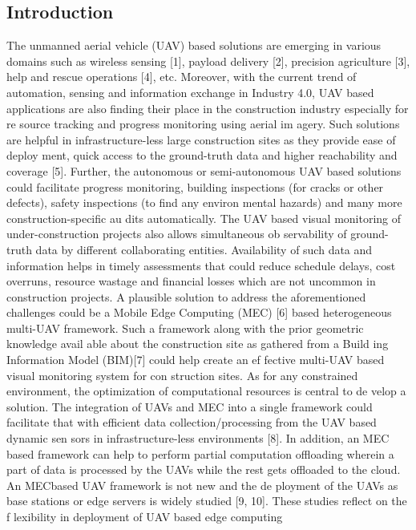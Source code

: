 \documentclass[a0,portrait ] {article}
\begin{document}
\begin{multicols}{2}
\section{Introduction} \label{sec:2}
The unmanned aerial vehicle (UAV) based solutions are
 emerging in various domains such as wireless sensing [1],
 payload delivery [2], precision agriculture [3], help and
 rescue operations [4], etc. Moreover, with the current
 trend of automation, sensing and information exchange
 in Industry 4.0, UAV based applications are also finding
 their place in the construction industry especially for re
source tracking and progress monitoring using aerial im
agery. Such solutions are helpful in infrastructure-less
 large construction sites as they provide ease of deploy
ment, quick access to the ground-truth data and higher
 reachability and coverage [5]. Further, the autonomous
 or semi-autonomous UAV based solutions could facilitate
 progress monitoring, building inspections (for cracks or
 other defects), safety inspections (to find any environ
mental hazards) and many more construction-specific au
dits automatically. The UAV based visual monitoring of
 under-construction projects also allows simultaneous ob
servability of ground-truth data by different collaborating
 entities. Availability of such data and information helps
 in timely assessments that could reduce schedule delays,
 cost overruns, resource wastage and financial losses which
 are not uncommon in construction projects.
 A plausible solution to address the aforementioned
 challenges could be a Mobile Edge Computing (MEC)
 [6] based heterogeneous multi-UAV framework. Such a
 framework along with the prior geometric knowledge avail
able about the construction site as gathered from a Build
ing Information Model (BIM)[7] could help create an ef
fective multi-UAV based visual monitoring system for con
struction sites. As for any constrained environment, the
 optimization of computational resources is central to de
velop a solution. The integration of UAVs and MEC into
 a single framework could facilitate that with efficient data
 collection/processing from the UAV based dynamic sen
sors in infrastructure-less environments [8]. In addition,
 an MEC based framework can help to perform partial
 computation offloading wherein a part of data is processed
 by the UAVs while the rest gets offloaded to the cloud.
 An MECbased UAV framework is not new and the de
ployment of the UAVs as base stations or edge servers
 is widely studied [9, 10]. These studies reflect on the f
 lexibility in deployment of UAV based edge computing

\end{multicols}
\end{document}
